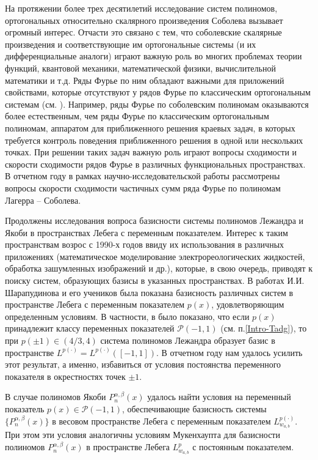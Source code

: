 
На протяжении более трех десятилетий исследование систем полиномов, ортогональных относительно скалярного произведения Соболева вызывает огромный интерес. Отчасти это связано с тем, что соболевские скалярные произведения и соответствующие им ортогональные системы (и их дифференциальные аналоги) играют важную роль во многих проблемах теории функций, квантовой механики, математической физики, вычислительной математики и т.д. Ряды Фурье по ним обладают важными для приложений свойствами, которые отсутствуют у рядов Фурье по классическим ортогональным системам (см. \cite{Ram-Ba-Ra-Pe, Ram-Mar-Xu, mmg-SharapudinovUMN}).
Например, ряды Фурье по соболевским полиномам оказываются более естественным, чем ряды Фурье по классическим ортогональным полиномам, аппаратом для приближенного решения краевых задач, в которых требуется контроль поведения приближенного решения в одной или нескольких точках.
При решении таких задач важную роль играют вопросы сходимости и скорости сходимости рядов Фурье в различных функциональных пространствах. В отчетном году в рамках научно-исследовательской работы рассмотрены вопросы скорости сходимости частичных сумм ряда Фурье по полиномам Лагерра -- Соболева.


Продолжены исследования вопроса базисности системы полиномов Лежандра и Якоби в пространствах Лебега с переменным показателем. Интерес к таким пространствам возрос с 1990-х годов ввиду их использования в различных приложениях (математическое моделирование электрореологических жидкостей, обработка зашумленных изображений и др.), которые, в свою очередь, приводят к поиску систем, образующих базисы в указанных пространствах. В работах И.И. Шарапудинова и его учеников \cite{tad-SHII-Haar, tad-SHII-AnalisysMath, tad-SHII-Leg, tad-MMG-Haar, tad-SHII-Jacob, tad-SHII-Ult, tad-RAM-Jacob} была показана базисность различных систем в пространстве Лебега с переменным показателем $p(x)$, удовлетворяющим определенным условиям.
В частности, в \cite{tad-SHII-Leg} было показано, что если $p(x)$ принадлежит классу переменных показателей $\mathcal{P}(-1,1)$ (см. п.\ref{Intro-Tadg}),
то при $p(\pm1)\in (4/3, 4)$ система полиномов Лежандра образует базис в пространстве $L^{p(\cdot)}=L^{p(\cdot)}([-1,1])$. В отчетном году нам удалось усилить этот результат, а именно, избавиться от условия постоянства переменного показателя в окрестностях точек $\pm1$.

В случае полиномов Якоби $P_n^{\alpha,\beta}(x)$ удалось найти условия на переменный показатель $p(x)\in \mathcal{P}(-1,1)$, обеспечивающие базисность системы $\{P_n^{\alpha,\beta}(x)\}$ в весовом пространстве Лебега с переменным показателем $L^{p(\cdot)}_{w_{a,b}}$. При этом эти условия аналогичны условиям Мукенхаупта для базисности полиномов $P_n^{\alpha,\beta}(x)$ в пространстве Лебега $L^{p}_{w_{a,b}}$ с постоянным показателем.


